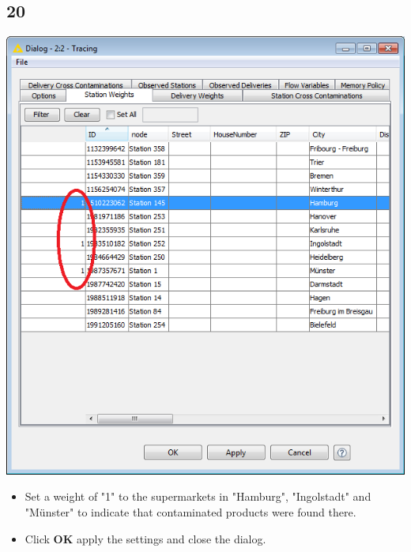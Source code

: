 \documentclass{beamer}
\begin{document}
\subsection{20}
\begin{frame}
	\begin{center}
  		\includegraphics[height=0.6\textheight]{20.png}
	\end{center}
	\begin{itemize}
		\item Set a weight of "1" to the supermarkets in "Hamburg", "Ingolstadt" and "Münster" to indicate that contaminated products were found there.
		\item Click \textbf{OK} apply the settings and close the dialog.
	\end{itemize}
\end{frame}
\end{document}
